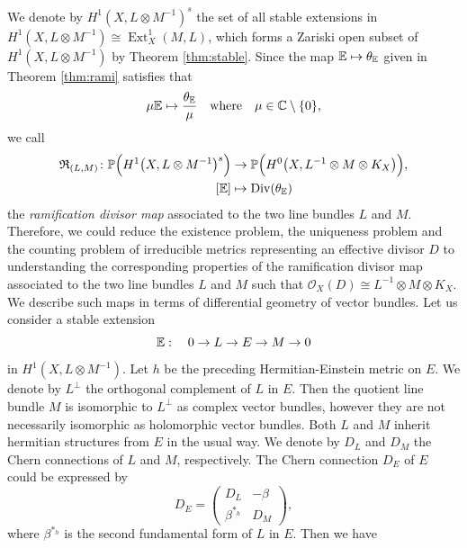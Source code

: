 \documentclass[12pt]{article}
\begin{document}
We denote by $H^{1}(X, L \otimes M^{-1})^{s}$ the set of all stable extensions in  $H^{1}(X, L \otimes M^{-1}) \cong \operatorname{Ext}_{X}^{1}(M, L)$, which forms a
Zariski open subset of $H^{1}(X, L \otimes M^{-1})$ by Theorem \ref{thm:stable}.
Since the map ${\Bbb E}\mapsto \theta_{\Bbb E}$ given in Theorem \ref{thm:rami} satisfies that
\[\mu{\Bbb E}\mapsto \frac{\theta_{\Bbb E}}{\mu}\quad{\rm where}\quad \mu\in {\Bbb C} \setminus \{0\},\]
we call
\begin{align*}
{\frak R}_{(L, M)}\colon \mathbb{P}\Big(H^{1}\big(X, L \otimes M^{-1}\big)^{s}\Big) &\rightarrow \mathbb{P}\Big(H^{0}\big(X, L^{-1} \otimes M \otimes K_{X}\big)\Big), \\
[{\Bbb E}] &\mapsto {\rm Div}(\theta_{\Bbb E})
\end{align*}
the {\it ramification divisor map} associated to the two line bundles $L$ and $M$.
Therefore, we could reduce the existence problem, the uniqueness problem and the counting problem of irreducible metrics representing an effective divisor $D$ to understanding the corresponding properties of the ramification divisor map associated to the two line bundles $L$ and $M$ such that ${\mathcal O}_{X}(D)\cong L^{-1}\otimes M\otimes K_X$.
We describe such maps in terms of differential geometry of vector bundles.
Let us consider a stable extension
\begin{equation}
\label{equ:extension}
{\Bbb E}:\quad 0 \to L \rightarrow E \rightarrow M \to 0
\end{equation}
in $H^{1}(X, L \otimes M^{-1})$. Let $h$ be the preceding Hermitian-Einstein metric on $E$. We denote by $L^{\perp}$ the orthogonal complement of $L$ in $E$. Then the quotient line bundle $M$ is isomorphic to $L^{\perp}$ as complex vector bundles, however they are not necessarily isomorphic as holomorphic vector bundles. Both $L$ and $M$ inherit hermitian structures from $E$ in the usual way. We denote by $D_{L}$ and $D_{M}$  the Chern connections of $L$ and $M$, respectively. The Chern connection $D_{E}$ of $E$ could be expressed by
\[ D_{E} = \begin{pmatrix}
D_{L} & -\beta \\
\beta^{*_{h}} & D_{M}
\end{pmatrix}, \]
where $\beta^{*_{h}}$ is the second fundamental form of $L$ in $E$. Then we have
\end{document}
